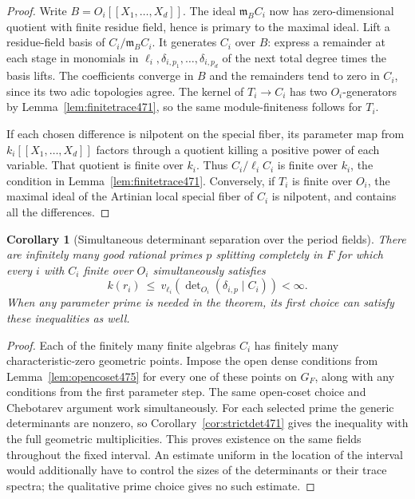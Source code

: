 \documentclass[a4paper,11pt]{article}
\newtheorem{corollary}[proposition]{Corollary}
\theoremstyle{definition}
\theoremstyle{remark}
\numberwithin{equation}{section}
\begin{document}
\begin{proof}
Write \(B=O_i[[X_1,\ldots,X_d]]\). The ideal
\(\mathfrak m_B C_i\) now has zero-dimensional quotient with
finite residue field, hence is primary to the maximal ideal.
Lift a residue-field basis of \(C_i/\mathfrak m_B C_i\).
It generates \(C_i\) over \(B\): express a remainder at each
stage in monomials in \(\ell_i,\delta_{i,p_1},\ldots,\delta_{i,p_d}\)
of the next total degree times the basis lifts. The coefficients
converge in \(B\) and the remainders tend to zero in \(C_i\),
since its two adic topologies agree. The kernel of \(T_i\to C_i\)
has two \(O_i\)-generators by Lemma~\ref{lem:finitetrace471},
so the same module-finiteness follows for \(T_i\).

If each chosen difference is nilpotent on the special fiber, its
parameter map from \(k_i[[X_1,\ldots,X_d]]\) factors through a
quotient killing a positive power of each variable. That quotient
is finite over \(k_i\). Thus \(C_i/\ell_i C_i\) is finite over
\(k_i\), the condition in Lemma~\ref{lem:finitetrace471}.
Conversely, if \(T_i\) is finite over \(O_i\), the maximal ideal
of the Artinian local special fiber of \(C_i\) is nilpotent,
and contains all the differences.
\end{proof}

\begin{corollary}[Simultaneous determinant separation over the period fields]\leavevmode
\label{cor:splitdet475}
There are infinitely many good rational primes \(p\) splitting
completely in \(F\) for which every \(i\) with \(C_i\) finite
over \(O_i\) simultaneously satisfies
\[
    k(r_i)\ \le\
    v_{\ell_i}\!\left(\det\nolimits_{O_i}
                 (\delta_{i,p}\mid C_i)\right)<\infty .
\]
When any parameter prime is needed in the theorem, its first
choice can satisfy these inequalities as well.
\end{corollary}
\begin{proof}
Each of the finitely many finite algebras \(C_i\) has finitely
many characteristic-zero geometric points. Impose the open
dense conditions from Lemma~\ref{lem:opencoset475} for every
one of these points on \(G_F\), along with any conditions from
the first parameter step. The same open-coset choice and
Chebotarev argument work simultaneously. For each selected
prime the generic determinants are nonzero, so
Corollary~\ref{cor:strictdet471} gives the inequality with the
full geometric multiplicities. This proves existence on the
same fields throughout the fixed interval. An estimate uniform
in the location of the interval would additionally have to
control the sizes of the determinants or their trace spectra;
the qualitative prime choice gives no such estimate.
\end{proof}
\end{document}
